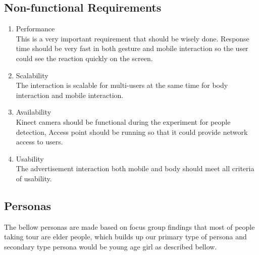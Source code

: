 \subsection{Non-functional Requirements}

\begin{enumerate}
\item	Performance \\
This is a very important requirement that should be wisely done. Response time should be very fast in both gesture and mobile interaction so the user could see the reaction quickly on the screen. 

\item	Scalability \\
The interaction is scalable for multi-users at the same time for body interaction and mobile interaction.

\item	Availability \\
Kinect camera should be functional during the experiment for people detection, Access point should be running so that it could provide network access to users.

\item	Usability \\
The advertisement interaction both mobile and body should meet all criteria of usability.
\end{enumerate}

\subsection{Personas}
The bellow personas are made based on focus group findings that most of people taking tour are elder people, which builds up our primary type of persona and secondary type persona would be young age girl as described bellow.



